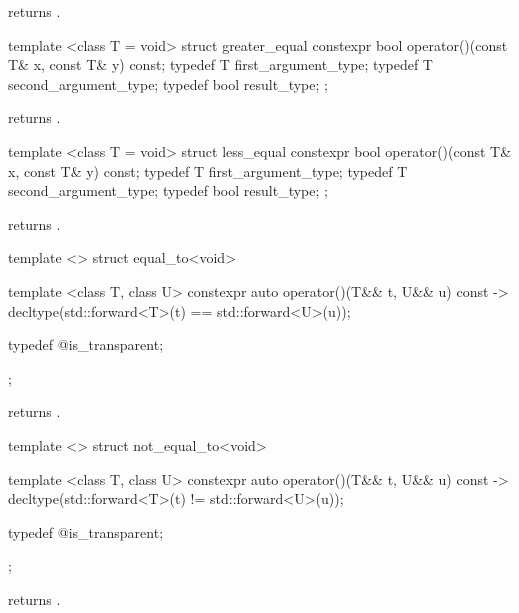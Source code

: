 \begin{itemdescr}
\pnum
{} returns .
\end{itemdescr}

%
\begin{itemdecl}
template <class T = void> struct greater_equal {
  constexpr bool operator()(const T& x, const T& y) const;
  typedef T first_argument_type;
  typedef T second_argument_type;
  typedef bool result_type;
};
\end{itemdecl}

\begin{itemdescr}
\pnum
{} returns .
\end{itemdescr}

%
\begin{itemdecl}
template <class T = void> struct less_equal {
  constexpr bool operator()(const T& x, const T& y) const;
  typedef T first_argument_type;
  typedef T second_argument_type;
  typedef bool result_type;
};
\end{itemdecl}

\begin{itemdescr}
\pnum
{} returns .
\end{itemdescr}

%
\begin{itemdecl}
template <> struct equal_to<void> {
  template <class T, class U> constexpr auto operator()(T&& t, U&& u) const
    -> decltype(std::forward<T>(t) == std::forward<U>(u));

  typedef @\unspec@ is_transparent;
};
\end{itemdecl}

\begin{itemdescr}
\pnum
{} returns .
\end{itemdescr}

%
\begin{itemdecl}
template <> struct not_equal_to<void> {
  template <class T, class U> constexpr auto operator()(T&& t, U&& u) const
    -> decltype(std::forward<T>(t) != std::forward<U>(u));

  typedef @\unspec@ is_transparent;
};
\end{itemdecl}

\begin{itemdescr}
\pnum
{} returns .
\end{itemdescr}

